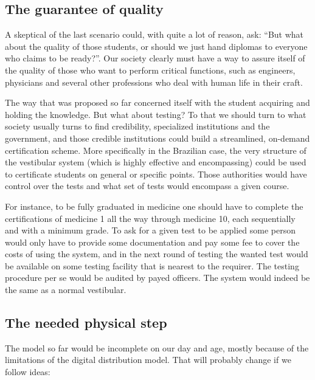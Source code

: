 \subsection{The guarantee of quality}

A skeptical of the last scenario could, with quite a lot of reason, ask: ``But
what about the quality of those students, or should we just hand diplomas to
everyone who claims to be ready?''. Our society clearly must have a way to
assure itself of the quality of those who want to perform critical functions,
such as engineers, physicians and several other professions who deal with human
life in their craft.    

The way that was proposed so far concerned itself with the student acquiring and
holding the knowledge. But what about testing? To that we should turn to what
society usually turns to find credibility, specialized institutions and the
government, and those credible institutions could build a streamlined, on-demand 
certification scheme. More specifically in the Brazilian case, the very
structure of the vestibular system (which is highly effective and encompassing)
could be used to certificate students on general or specific points. Those
authorities would have control over the tests and what set of tests would
encompass a given course. 

For instance, to be fully graduated in medicine one should have to complete the
certifications of medicine 1 all the way through medicine 10, each sequentially
and with a minimum grade. To ask for a given test to be applied some person
would only have to provide some documentation and pay some fee to cover the
costs of using the system, and in the next round of testing the wanted test
would be available on some testing facility that is nearest to the requirer. The
testing procedure per se would be audited by payed officers. The system would
indeed be the same as a normal vestibular.


\subsection{The needed physical step}

The model so far would be incomplete on our day and age, mostly because of the
limitations of the digital distribution model. That will probably change if we
follow \cite{futurism:kurzweil_singularity_is_near} ideas:

